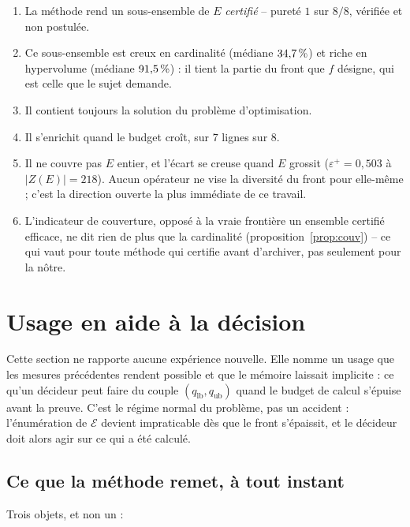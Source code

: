 \documentclass[11pt,a4paper]{article}
\theoremstyle{plain}
\theoremstyle{remark}
\newcommand{\Ecal}{\mathcal{E}}
\begin{document}
\begin{enumerate}
\item La méthode rend un sous-ensemble de $E$ \emph{certifié} -- pureté $1$
  sur $8/8$, vérifiée et non postulée.
\item Ce sous-ensemble est creux en cardinalité (médiane $34{,}7{}\,\%$) et
  riche en hypervolume (médiane $91{,}5{}\,\%$) : il tient la partie du front
  que $f$ désigne, qui est celle que le sujet demande.
\item Il contient toujours la solution du problème d'optimisation.
\item Il s'enrichit quand le budget croît, sur $7$ lignes sur $8$.
\item Il ne couvre pas $E$ entier, et l'écart se creuse quand $E$ grossit
  ($\varepsilon^+ = 0{,}503$ à $|Z(E)| = 218$). Aucun opérateur ne vise la
  diversité du front pour elle-même ; c'est la direction ouverte la plus
  immédiate de ce travail.
\item L'indicateur de couverture, opposé à la vraie frontière un ensemble
  certifié efficace, ne dit rien de plus que la cardinalité
  (proposition~\ref{prop:couv}) -- ce qui vaut pour toute méthode qui
  certifie avant d'archiver, pas seulement pour la nôtre.
\end{enumerate}

\section{Usage en aide à la décision}
\label{sec:aide}

Cette section ne rapporte aucune expérience nouvelle. Elle nomme un usage que
les mesures précédentes rendent possible et que le mémoire laissait implicite :
ce qu'un décideur peut faire du couple $(q_{\text{lb}},q_{\text{ub}})$ quand
le budget de calcul s'épuise avant la preuve. C'est le régime normal du
problème, pas un accident : l'énumération de $\Ecal$ devient impraticable dès
que le front s'épaissit, et le décideur doit alors agir sur ce qui a été
calculé.

\subsection{Ce que la méthode remet, à tout instant}

Trois objets, et non un :
\end{document}
